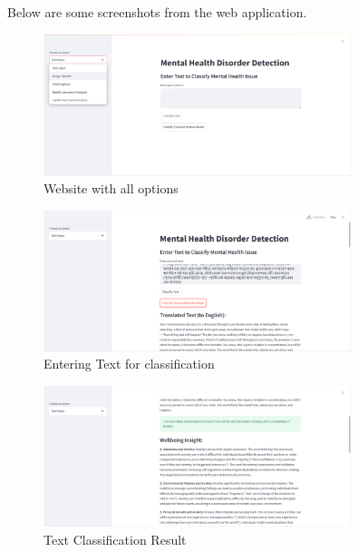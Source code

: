\pagebreak
\noindent
Below are some screenshots from the web application.

\begin{figure}[h!]  
    \centering
    \includegraphics[width=0.8\textwidth]{App Images/01 Interface.png}  
    \caption{Website with all options}
    \label{01i}  %
\end{figure}

\begin{figure}[h!]  
    \centering
    \includegraphics[width=0.8\textwidth]{App Images/02 Interface.png}  
    \caption{Entering Text for classification}
    \label{02i}  %
\end{figure}

\begin{figure}[h!]  
    \centering
    \includegraphics[width=0.8\textwidth]{App Images/03 Interface.png}  
    \caption{Text Classification Result}
    \label{03i}  %
\end{figure}

